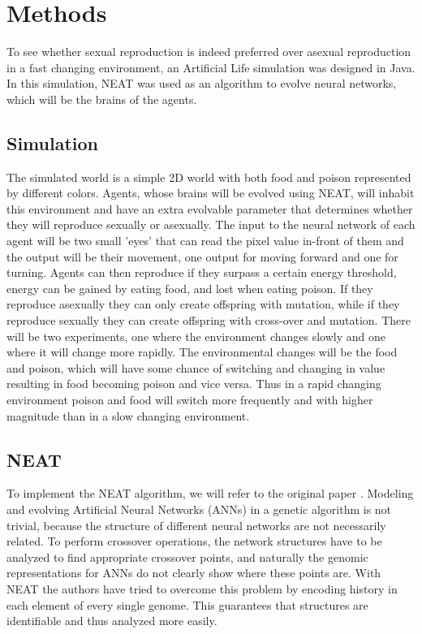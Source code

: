 \section{Methods}

To see whether sexual reproduction is indeed preferred over asexual reproduction in a fast changing environment, an Artificial Life simulation was designed in Java. In this simulation, NEAT was used as an algorithm to evolve neural networks, which will be the brains of the agents.

\subsection{Simulation}

The simulated world is a simple 2D world with both food and poison represented by different colors.
Agents, whose brains will be evolved using NEAT, will inhabit this environment and have an extra evolvable parameter that determines whether they will reproduce sexually or asexually. 
The input to the neural network of each agent will be two small 'eyes' that can read the pixel value in-front of them and the output will be their movement, one output for moving forward and one for turning. 
Agents can then reproduce if they surpass a certain energy threshold, energy can be gained by eating food, and lost when eating poison. 
If they reproduce asexually they can only create offspring with mutation, while if they reproduce sexually they can create offspring with cross-over and mutation. 
There will be two experiments, one where the environment changes slowly and one where it will change more rapidly. The environmental changes will be the food and poison, which will have some chance of switching and changing in value resulting in food becoming poison and vice versa. 
Thus in a rapid changing environment poison and food will switch more frequently and with higher magnitude than in a slow changing environment.

\subsection{NEAT}

To implement the NEAT algorithm, we will refer to the original paper \cite{stanleyneat}.
Modeling and evolving Artificial Neural Networks (ANNs) in a genetic algorithm is not trivial, because the structure of different neural networks are not necessarily related.
To perform crossover operations, the network structures have to be analyzed to find appropriate crossover points, and naturally the genomic representations for ANNs do not clearly show where these points are.
With NEAT the authors have tried to overcome this problem by encoding history in each element of every single genome.
This guarantees that structures are identifiable and thus analyzed more easily.

